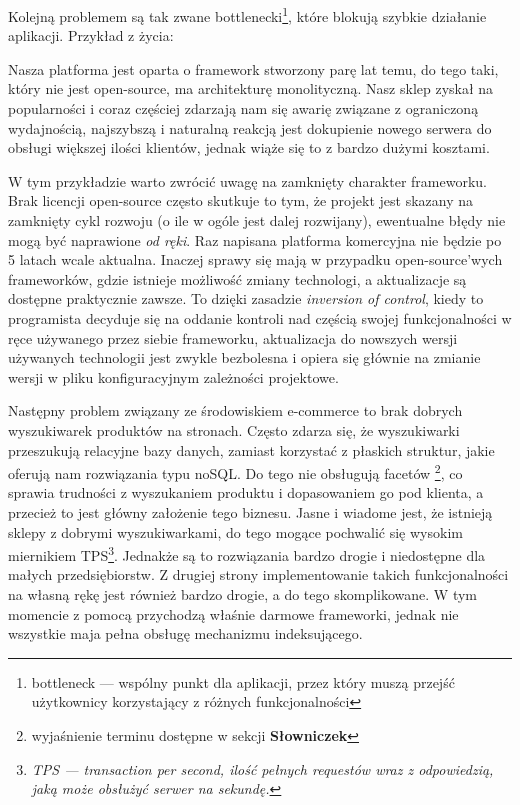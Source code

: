 Kolejną problemem są tak zwane bottlenecki\footnote{bottleneck — wspólny punkt dla aplikacji, przez który muszą przejść użytkownicy korzystający z różnych funkcjonalności}, które blokują szybkie działanie aplikacji. Przykład z życia: 
\begin{example}
	Nasza platforma jest oparta o framework stworzony parę lat temu, do tego taki, który nie jest open-source, ma architekturę monolityczną. Nasz sklep zyskał na popularności i coraz częściej zdarzają nam się awarię związane z ograniczoną wydajnością, najszybszą i naturalną reakcją jest dokupienie nowego serwera do obsługi większej ilości klientów, jednak wiąże się to z bardzo dużymi kosztami.
\end{example} 
W tym przykładzie warto zwrócić uwagę na zamknięty charakter frameworku. Brak licencji open-source często skutkuje to tym, że projekt jest skazany na zamknięty cykl rozwoju (o ile w ogóle jest dalej rozwijany), ewentualne błędy nie mogą być naprawione \textit{od ręki}. Raz napisana platforma komercyjna nie będzie po 5 latach wcale aktualna. Inaczej sprawy się mają w przypadku open-source'wych frameworków, gdzie istnieje możliwość zmiany technologi, a aktualizacje są dostępne praktycznie zawsze. To dzięki zasadzie \textit{inversion of control}, kiedy to programista decyduje się na oddanie kontroli nad częścią swojej funkcjonalności w ręce używanego przez siebie frameworku, aktualizacja do nowszych wersji używanych technologii jest zwykle bezbolesna i opiera się głównie na zmianie wersji w pliku konfiguracyjnym zależności projektowe.

Następny problem związany ze środowiskiem e-commerce to brak dobrych wyszukiwarek produktów na stronach. Często zdarza się, że wyszukiwarki przeszukują relacyjne bazy danych, zamiast korzystać z płaskich struktur, jakie oferują nam rozwiązania typu noSQL. Do tego nie obsługują facetów \footnote{wyjaśnienie terminu dostępne w sekcji \textbf{Słowniczek}}, co sprawia trudności z wyszukaniem produktu i dopasowaniem go pod klienta, a przecież to jest główny założenie tego biznesu. Jasne i wiadome jest, że istnieją sklepy z dobrymi wyszukiwarkami, do tego mogące pochwalić się wysokim miernikiem TPS\footnote{\textit{TPS — transaction per second, ilość pełnych requestów wraz z odpowiedzią, jaką może obsłużyć serwer na sekundę.}}. Jednakże są to rozwiązania bardzo drogie i niedostępne dla małych przedsiębiorstw. Z drugiej strony implementowanie takich funkcjonalności na własną rękę jest również bardzo drogie, a do tego skomplikowane. W tym momencie z pomocą przychodzą właśnie darmowe frameworki, jednak nie wszystkie maja pełna obsługę mechanizmu indeksującego.

